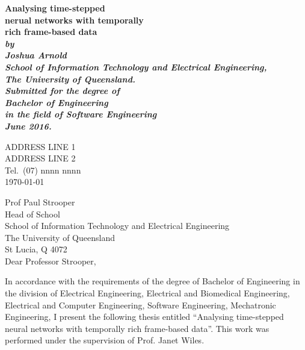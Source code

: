 \documentclass[12pt,openany,a4paper]{book}
\renewcommand{\baselinestretch}{1.2}	%
\begin{document}
\frontmatter

\begin{titlepage}
\renewcommand{\baselinestretch}{1.0}
\begin{center}
\vspace*{35mm}
\Huge\bf
		Analysing time-stepped \\
        nerual networks with temporally \\
        rich frame-based data \\
\vspace{20mm}
\large\sl
		by\\
		Joshua Arnold
		\medskip\\
\rm
		School of Information Technology and Electrical Engineering,\\
		The University of Queensland.\\
\vspace{30mm}
		Submitted for the degree of\\
		Bachelor of Engineering
		\smallskip\\
\normalsize
		in the field of Software Engineering
		\medskip\\
\large
		June 2016.		
\end{center}
\end{titlepage}

\cleardoublepage

\begin{flushright}
	ADDRESS LINE 1\\
	ADDRESS LINE 2\\
	Tel.\ (07) nnnn nnnn\\
	\medskip
	\today
\end{flushright}
\begin{flushleft}
  Prof Paul Strooper\\
  Head of School\\
  School of Information Technology and Electrical Engineering\\
  The University of Queensland\\
  St Lucia, Q 4072\\
  \bigskip\bigskip
  Dear Professor Strooper,
\end{flushleft}

In accordance with the requirements of the degree of Bachelor of
Engineering in the division of 
Electrical Engineering,
Electrical and Biomedical Engineering,
Electrical and Computer Engineering,
Software Engineering,
Mechatronic Engineering,
I present the
following thesis entitled ``Analysing time-stepped neural networks with temporally rich frame-based data''.  This work was performed under the supervision of Prof. Janet Wiles.
\end{document}
